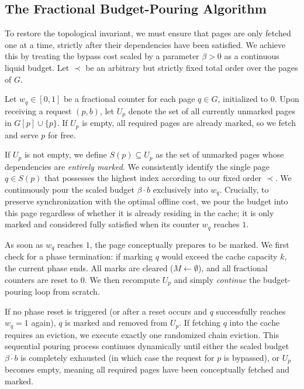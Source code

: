 \documentclass[a4paper]{article}
\begin{document}
\subsection*{The Fractional Budget-Pouring Algorithm}

To restore the topological invariant, we must ensure that pages are only fetched one at a time, strictly after their dependencies have been satisfied. We achieve this by treating the bypass cost scaled by a parameter $\beta > 0$ as a continuous liquid budget. Let $\prec$ be an arbitrary but strictly fixed total order over the pages of $G$. 

Let $w_q \in [0,1]$ be a fractional counter for each page $q \in G$, initialized to $0$. Upon receiving a request $(p, b)$, let $U_p$ denote the set of all currently unmarked pages in $G[p] \cup \{p\}$. If $U_p$ is empty, all required pages are already marked, so we fetch and serve $p$ for free. 

If $U_p$ is not empty, we define $S(p) \subseteq U_p$ as the set of unmarked pages whose dependencies are \textit{entirely marked}. We consistently identify the single page $q \in S(p)$ that possesses the highest index according to our fixed order $\prec$. We continuously pour the scaled budget $\beta \cdot b$ exclusively into $w_q$. Crucially, to preserve synchronization with the optimal offline cost, we pour the budget into this page regardless of whether it is already residing in the cache; it is only marked and considered fully satisfied when its counter $w_q$ reaches $1$. 

As soon as $w_q$ reaches $1$, the page conceptually prepares to be marked. We first check for a phase termination: if marking $q$ would exceed the cache capacity $k$, the current phase ends. All marks are cleared ($M \gets \emptyset$), and all fractional counters are reset to $0$. We then recompute $U_p$ and simply \textit{continue} the budget-pouring loop from scratch. 

If no phase reset is triggered (or after a reset occurs and $q$ successfully reaches $w_q = 1$ again), $q$ is marked and removed from $U_p$. If fetching $q$ into the cache requires an eviction, we execute exactly one randomized chain eviction. This sequential pouring process continues dynamically until either the scaled budget $\beta \cdot b$ is completely exhausted (in which case the request for $p$ is bypassed), or $U_p$ becomes empty, meaning all required pages have been conceptually fetched and marked.
\end{document}
